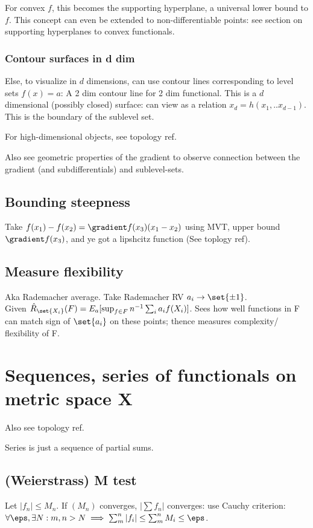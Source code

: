 \documentclass[oneside, article]{memoir}
\begin{document}
For convex $f$, this becomes the supporting hyperplane, a universal lower bound to $f$. This concept can even be extended to non-differentiable points: see section on supporting hyperplanes to convex functionals.

\subsubsection{Contour surfaces in d dim}
Else, to visualize in $d$ dimensions, can use contour lines corresponding to level sets $f(x) = a$: A 2 dim contour line for 2 dim functional. This is a $d$ dimensional (possibly closed) surface: can view as a relation $x_{d}= h(x_{1}, .. x_{d-1})$. This is the boundary of the sublevel set.

For high-dimensional objects, see topology ref.

Also see geometric properties of the gradient to observe connection between the gradient (and subdifferentials) and sublevel-sets.

\subsection{Bounding steepness}
Take $f(x_1) - f(x_2) = \gradient f(x_3) (x_1 - x_2)$ using MVT, upper bound $\gradient f(x_3)$, and ye got a lipshcitz function (See toplogy ref).

\subsection{Measure flexibility}
Aka Rademacher average. Take Rademacher RV $a_{i} \to \set{\pm 1}$.\\
Given $\hat{R}_{\set{X_{i}}}(F) = E_{a}[\sup_{f\in F}n^{-1} \sum_{i} a_{i}f(X_{i})]$. Sees how well functions in F can match sign of $\set{a_{i}}$ on these points; thence measures complexity/ flexibility of F.


\section{Sequences, series of functionals on metric space X}
Also see topology ref.

Series is just a sequence of partial sums.

\subsection{(Weierstrass) M test}
Let $|f_{n}| \leq M_{n}$. If $(M_{n})$ converges, $|\sum f_{n}|$ converges: use Cauchy criterion: $\forall \eps, \exists N: m, n > N \implies \sum_{m}^{n} |f_{i}| \leq \sum_{m}^{n} M_{i} \leq \eps$.
\end{document}
